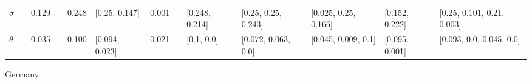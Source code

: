 \begin{table}[H]
\begin{adjustbox}{width=\textwidth}
\begin{tabular}{lrrlrllllllll}
	$\sigma$ &        &  0.129 &                 &  0.248 &   [0.25, 0.147] &           0.001 &                         &  [0.248, 0.214] &    [0.25, 0.25, 0.243] &   [0.025, 0.25, 0.166] &  [0.152, 0.222] &    [0.25, 0.101, 0.21, 0.003] \\
	$\theta$ &        &  0.035 &                 &  0.100 &  [0.094, 0.023] &           0.021 &                         &      [0.1, 0.0] &    [0.072, 0.063, 0.0] &    [0.045, 0.009, 0.1] &  [0.095, 0.001] &      [0.093, 0.0, 0.045, 0.0] \\
	\bottomrule
\end{tabular}
		
	\end{adjustbox}
	
\end{table}

\begin{table}[H]
	\centering
	\caption{Germany}
	\label{germany_table}
	
	\begin{adjustbox}{width=\textwidth}
		

\end{adjustbox}
\end{table}
